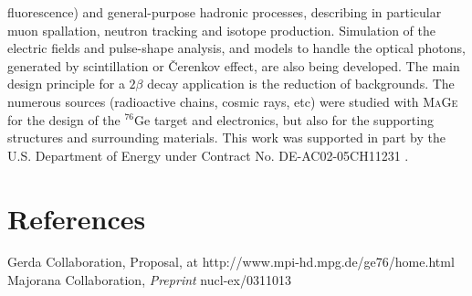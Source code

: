 \documentclass[a4paper]{jpconf}
\begin{document}
fluorescence) and general-purpose hadronic processes, describing in particular 
muon spallation, neutron tracking and isotope production. Simulation
of the electric fields and pulse-shape analysis, and models to
handle the optical photons, generated by scintillation or \v{C}erenkov effect, 
are also being developed.  
The main design principle for a $2\beta$ decay application is the
reduction of backgrounds. The numerous sources (radioactive chains,
cosmic rays, etc) were studied with \textsc{MaGe} for the
design of the $^{76}$Ge target and electronics, but also for the
supporting structures and 
surrounding materials. 
\ack This work was supported in part by the U.S. Department of 
Energy under Contract No. DE-AC02-05CH11231 .
\section*{References}
\begin{thebibliography}{9}
 Gerda Collaboration, Proposal, at
http://www.mpi-hd.mpg.de/ge76/home.html
 Majorana Collaboration, {\it Preprint} nucl-ex/0311013 
\end{thebibliography}
\end{document}
